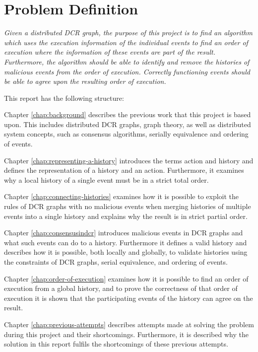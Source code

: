 \section{Problem Definition}
	\textit{Given a distributed DCR graph, the purpose of this project is to find an algorithm which uses the execution information of the individual events to find an order of execution where the information of these events are part of the result. Furthermore, the algorithm should be able to identify and remove the histories of malicious events from the order of execution. Correctly functioning events should be able to agree upon the resulting order of execution.}
	
	\vspace{0.4cm}
	
	\newpar
	This report has the following structure:
	
	\newpar
	Chapter \ref{chap:background} describes the previous work that this project is based upon. This includes distributed DCR graphs, graph theory, as well as distributed system concepts, such as consensus algorithms, serially equivalence and ordering of events.
		
	\newpar
	Chapter \ref{chap:representing-a-history} introduces the terms action and history and defines the representation of a history and an action.
	Furthermore, it examines why a local history of a single event must be in a strict total order.
		
	\newpar
	Chapter \ref{chap:connecting-histories} examines how it is possible to exploit the rules of DCR graphs with no malicious events when merging histories of multiple events into a single history and explains why the result is in strict partial order.
	
	\newpar
	Chapter \ref{chap:consensusindcr} introduces malicious events in DCR graphs and what such events can do to a history. Furthermore it defines a valid history and describes how it is possible, both locally and globally, to validate histories using the constraints of DCR graphs, serial equivalence, and ordering of events.
	
    \newpar
    Chapter \ref{chap:order-of-execution} examines how it is possible to find an order of execution from a global history, and to prove the correctness of that order of execution it is shown that the participating events of the history can agree on the result.
    
	\newpar
	Chapter \ref{chap:previous-attempts} describes attempts made at solving the problem during this project and their shortcomings. Furthermore, it is described why the solution in this report fulfils the shortcomings of these previous attempts. 
		
	